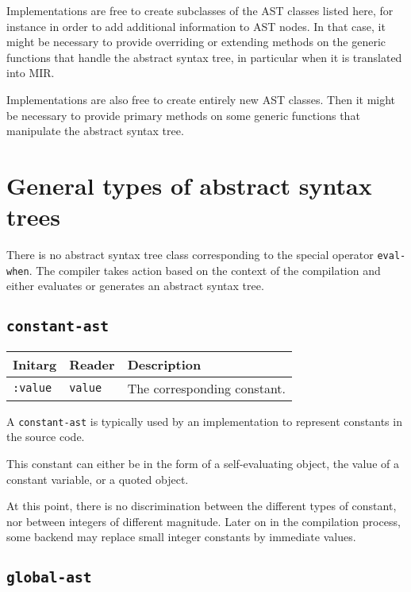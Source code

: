 Implementations are free to create subclasses of the AST classes
listed here, for instance in order to add additional information to
AST nodes.  In that case, it might be necessary to provide overriding
or extending methods on the generic functions that handle the abstract
syntax tree, in particular when it is translated into MIR.  

Implementations are also free to create entirely new AST classes.
Then it might be necessary to provide primary methods on some generic
functions that manipulate the abstract syntax tree.%

\section{General types of abstract syntax trees}

There is no abstract syntax tree class corresponding to the special
operator \texttt{eval-when}.  The compiler takes action based on the
context of the compilation and either evaluates or generates an
abstract syntax tree.

\subsection{\texttt{constant-ast}}
\label{constant-ast}

\begin{tabular}{|l|l|l|}
\hline
Initarg & Reader & Description\\
\hline\hline
\texttt{:value} & \texttt{value} & The corresponding constant.\\
\hline
\end{tabular}

A \texttt{constant-ast} is typically used by an implementation to
represent constants in the source code.

This constant can either be in the form of a self-evaluating object,
the value of a constant variable, or a quoted object.

At this point, there is no discrimination between the different types
of constant, nor between integers of different magnitude.  Later on
in the compilation process, some backend may replace small integer
constants by immediate values. 

\subsection{\texttt{global-ast}}
\label{global-ast}


